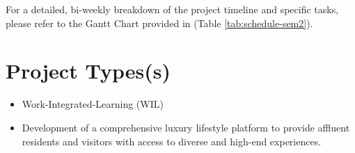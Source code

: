 For a detailed, bi-weekly breakdown of the project timeline and specific tasks, please refer to the Gantt Chart provided in (Table \ref{tab:schedule-sem2}).

\vspace{1em}


\section{Project Types(s)}
\begin{itemize}
    \item Work-Integrated-Learning (WIL)
    \item Development of a comprehensive luxury lifestyle platform to provide affluent residents and visitors with access to diverse and high-end experiences.
\end{itemize}